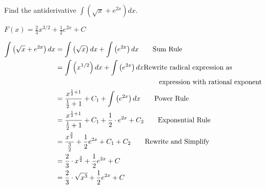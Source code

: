 \begin{example}
Find the antiderivative $\displaystyle\int \left(\sqrt{x}+e^{2x}\right) dx$. 
    \begin{sol}
     $F(x)=\displaystyle\frac{2}{3}x^{3/2}+\frac{1}{2}e^{2x}+C$ 
    \end{sol}
    \begin{solL}
   \begin{displaymath}
        \begin{split}
            \int \left(\sqrt{x}+e^{2x}\right) dx&=\int \left(\sqrt{x}\right) dx+\int \left(e^{2x}\right) dx \qquad \text{Sum Rule}\\
            &= \int \left(x^{1/2}\right) dx+\int \left(e^{2x}\right) dx \text{Rewrite radical expression as} \\
            & \hspace{5.25cm} \text{expression with rational exponent} \\
            &=\frac{x^{\frac{1}{2}+1}}{\frac{1}{2}+1}+C_1+\int \left(e^{2x}\right) dx \qquad \text{Power Rule} \\
            &=\frac{x^{\frac{1}{2}+1}}{\frac{1}{2}+1}+C_1+\frac{1}{2}\cdot e^{2x}+C_2 \qquad\text{Exponential Rule} \\
            &=\frac{x^{\frac{3}{2}}}{\frac{3}{2}}+\frac{1}{2}e^{2x}+C_1+C_2 \qquad \text{Rewrite and Simplify}\\
            &=\frac{2}{3}\cdot x^{\frac{3}{2}}+\frac{1}{2}e^{2x}+C\\
            &=\frac{2}{3}\cdot \sqrt{x^3}+\frac{1}{2}e^{2x}+C\\
        \end{split}
    \end{displaymath}
    
    \end{solL}
    
\end{example}

